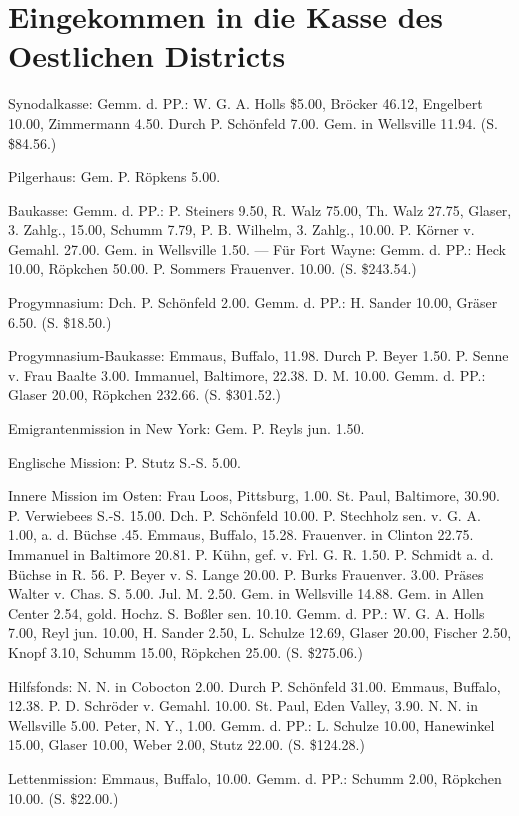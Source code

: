 \chapter[Kasse des Oestlichen Districts]{Eingekommen in die Kasse des Oestlichen Districts}

Synodalkasse: Gemm. d. PP.: W. G. A. Holls \$5.00, Bröcker 46.12, Engelbert 10.00, Zimmermann 4.50. Durch P. Schönfeld 7.00. Gem. in Wellsville 11.94. (S. \$84.56.)

Pilgerhaus: Gem. P. Röpkens 5.00.

Baukasse: Gemm. d. PP.: P. Steiners 9.50, R. Walz 75.00, Th. Walz 27.75, Glaser, 3. Zahlg., 15.00, Schumm 7.79, P. B. Wilhelm, 3. Zahlg., 10.00. P. Körner v. Gemahl. 27.00. Gem. in Wellsville 1.50. — Für Fort Wayne: Gemm. d. PP.: Heck 10.00, Röpkchen 50.00. P. Sommers Frauenver. 10.00. (S. \$243.54.)

Progymnasium: Dch. P. Schönfeld 2.00. Gemm. d. PP.: H. Sander 10.00, Gräser 6.50. (S. \$18.50.)

Progymnasium-Baukasse: Emmaus, Buffalo, 11.98. Durch P. Beyer 1.50. P. Senne v. Frau Baalte 3.00. Immanuel, Baltimore, 22.38. D. M. 10.00. Gemm. d. PP.: Glaser 20.00, Röpkchen 232.66. (S. \$301.52.)

Emigrantenmission in New York: Gem. P. Reyls jun. 1.50.

Englische Mission: P. Stutz S.-S. 5.00.

Innere Mission im Osten: Frau Loos, Pittsburg, 1.00. St. Paul, Baltimore, 30.90. P. Verwiebees S.-S. 15.00. Dch. P. Schönfeld 10.00. P. Stechholz sen. v. G. A. 1.00, a. d. Büchse .45. Emmaus, Buffalo, 15.28. Frauenver. in Clinton 22.75. Immanuel in Baltimore 20.81. P. Kühn, gef. v. Frl. G. R. 1.50. P. Schmidt a. d. Büchse in R. 56. P. Beyer v. S. Lange 20.00. P. Burks Frauenver. 3.00. Präses Walter v. Chas. S. 5.00. Jul. M. 2.50. Gem. in Wellsville 14.88. Gem. in Allen Center 2.54, gold. Hochz. S. Boßler sen. 10.10. Gemm. d. PP.: W. G. A. Holls 7.00, Reyl jun. 10.00, H. Sander 2.50, L. Schulze 12.69, Glaser 20.00, Fischer 2.50, Knopf 3.10, Schumm 15.00, Röpkchen 25.00. (S. \$275.06.)

Hilfsfonds: N. N. in Cobocton 2.00. Durch P. Schönfeld 31.00. Emmaus, Buffalo, 12.38. P. D. Schröder v. Gemahl. 10.00. St. Paul, Eden Valley, 3.90. N. N. in Wellsville 5.00. Peter, N. Y., 1.00. Gemm. d. PP.: L. Schulze 10.00, Hanewinkel 15.00, Glaser 10.00, Weber 2.00, Stutz 22.00. (S. \$124.28.)

Lettenmission: Emmaus, Buffalo, 10.00. Gemm. d. PP.: Schumm 2.00, Röpkchen 10.00. (S. \$22.00.)

